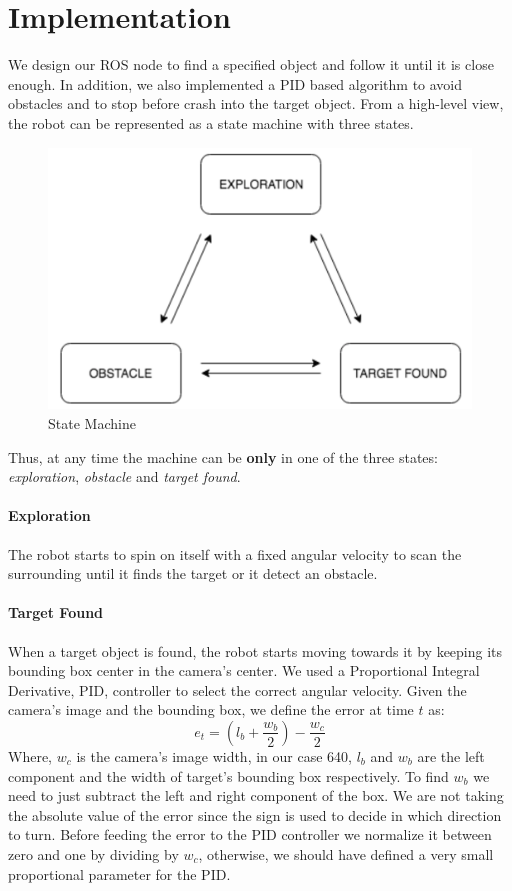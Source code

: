 \documentclass[letterpaper, 10 pt, conference]{ieeeconf}  %
\begin{document}
\section{Implementation}
We design our ROS node to find a specified object and follow it until it is close enough. In addition, we also implemented a PID based algorithm to avoid obstacles and to stop before crash into the target object. From a high-level view, the robot can be represented as a state machine with three states.
\begin{figure}[H]
\centering
\includegraphics[width=\linewidth]{images/state}
\caption{State Machine}
\end{figure}
Thus, at any time the machine can be \textbf{only} in one of the three states: \emph{exploration}, \emph{obstacle} and \emph{target found}. 

\paragraph{Exploration} The robot starts to spin on itself with a fixed angular velocity to scan the surrounding until it finds the target or it detect an obstacle.
\paragraph{Target Found} When a target object is found, the robot starts moving towards it by keeping its bounding box center in the camera's center. We used a Proportional Integral Derivative, PID, controller to select the correct angular velocity. Given the camera's image and the bounding box, we define the error at time $t$ as:
\begin{equation}
e_t =  (l_b + \frac{w_b}{2}) - \frac{w_c}{2}
\end{equation}
Where, $w_c$ is the camera's image width, in our case 640, $l_b$ and $w_b$ are the left component and the width of target's bounding box respectively. To find $w_b$ we need to just subtract the left and right component of the box. We are not taking the absolute value of the error since the sign is used to decide in which direction to turn. Before feeding the error to the PID controller we normalize it between zero and one by dividing by $w_c$, otherwise, we should have defined a very small proportional parameter for the PID. 
\end{document}
